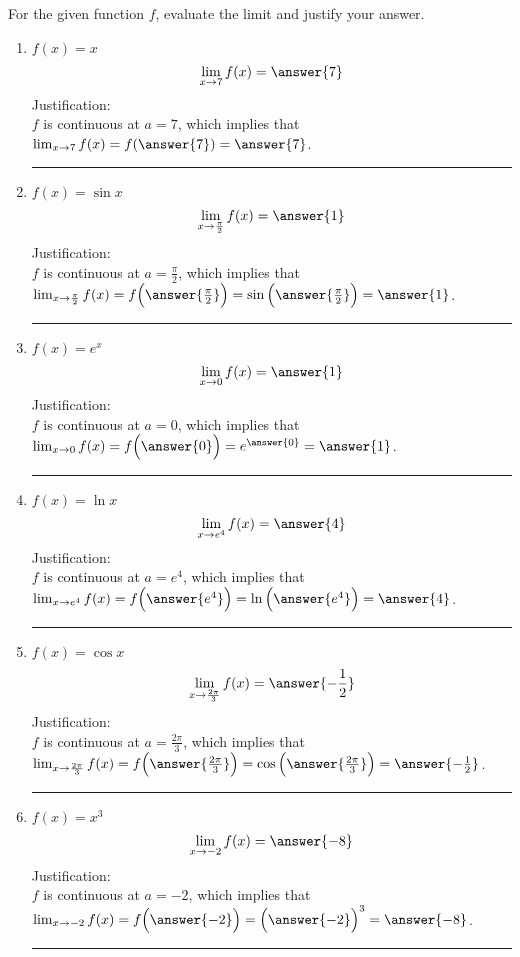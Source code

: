\documentclass{ximera}
\author{Nela Lakos}
\begin{document}
\begin{exercise}


For the given function $f$, evaluate the limit and justify your answer.\\


\begin{enumerate}
 \item $f(x)=x$
 \[
\lim_{x\to 7}f(x) = \answer{7}
\] 
Justification:\\ $f$ is continuous at $a=7$, which implies that
$\lim_{x\to 7}f(x)=f(\answer{7})=\answer{7}$.

\noindent\rule[0.5ex]{\linewidth}{.2pt}

\item $f(x)=\sin{x}$
 \[
\lim_{x\to \frac{\pi}{2}}f(x) = \answer{1}
\] 
Justification:\\ $f$ is continuous at $a=\frac{\pi}{2}$, which implies that\\[1em]
$\lim_{x\to \frac{\pi}{2}}f(x)=f\Bigl(\answer{\frac{\pi}{2}}\Bigr)=\sin{\Bigl(\answer{\frac{\pi}{2}}\Bigr)}=\answer{1}$.

\noindent\rule[0.5ex]{\linewidth}{.2pt}

\item  $f(x)=e^{x}$
 \[
\lim_{x\to 0}f(x) = \answer{1}
\] 
Justification:\\ $f$ is continuous at $a=0$, which implies that\\[1em]
$\lim_{x\to 0}f(x)=f\Bigl(\answer{0}\Bigr)=e^{\answer{0}}=\answer{1}$.

\noindent\rule[0.5ex]{\linewidth}{.2pt}

\item  $f(x)=\ln{x}$
 \[
\lim_{x\to e^{4}}f(x) = \answer{4}
\] 
Justification:\\ $f$ is continuous at $a=e^{4}$, which implies that\\[1em]
$\lim_{x\to e^{4}}f(x)=f\Bigl(\answer{e^{4}}\Bigr)=\ln{\Bigl(\answer{e^{4}}\Bigr)}=\answer{4}$.

\noindent\rule[0.5ex]{\linewidth}{.2pt}

\item $f(x)=\cos{x}$
 \[
\lim_{x\to \frac{2\pi}{3}}f(x) = \answer{-\frac{1}{2}}
\] 
Justification:\\ $f$ is continuous at $a= \frac{2\pi}{3}$, which implies that\\[1em]
$\lim_{x\to \frac{2\pi}{3}}f(x)=f\Bigl(\answer{ \frac{2\pi}{3}}\Bigr)=\cos{\Bigl(\answer{ \frac{2\pi}{3}}\Bigr)}=\answer{-\frac{1}{2}}$.

\noindent\rule[0.5ex]{\linewidth}{.2pt}

\item  $f(x)=x^3$
 \[
\lim_{x\to -2}f(x) = \answer{-8}
\] 
Justification:\\ $f$ is continuous at $a=-2$, which implies that\\[1em]
$\lim_{x\to -2}f(x)=f\Bigl(\answer{ -2}
\Bigr)=\Bigl(\answer{-2 }\Bigr)^3=\answer{-8}$.

\noindent\rule[0.5ex]{\linewidth}{.2pt}
\end{enumerate}
\end{exercise}
\end{document}
